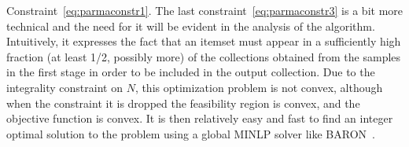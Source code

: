 Constraint~\eqref{eq:parmaconstr1}. The last constraint~\eqref{eq:parmaconstr3} is a bit
more technical and the need for it will be evident in the analysis of the
algorithm. Intuitively, it expresses the fact that an itemset must appear in a
sufficiently high fraction (at least 1/2, possibly more) of the collections obtained from the samples in the
first stage in order to be included in the output collection. Due to the integrality constraint on
$N$, this optimization problem is not convex, although when the constraint it is
dropped the feasibility region is convex, and the objective function is convex.
It is then relatively easy and fast to find an integer optimal solution to the
problem using a global MINLP solver like BARON~\cite{baron}. 


